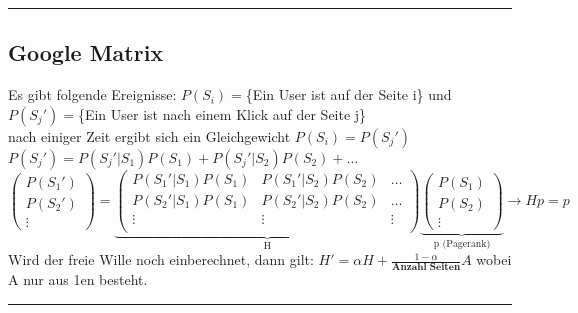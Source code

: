 \hrule

\subsection{Google Matrix}
	Es gibt folgende Ereignisse: $P(S_i)=$\{Ein User ist auf der Seite i\} und \\
								 \hspace*{43.3mm}$P(S_j')=$\{Ein User ist nach einem Klick auf der Seite j\} \\
	nach einiger Zeit ergibt sich ein Gleichgewicht $P(S_i)=P(S_j')$ \\
	$P(S_j')=P(S_j'|S_1)P(S_1)+P(S_j'|S_2)P(S_2)+\dots$ \\
	$\begin{pmatrix}P(S_1')\\P(S_2')\\\vdots\end{pmatrix} = 
	\underbrace{\begin{pmatrix}P(S_1'|S_1)P(S_1) & P(S_1'|S_2)P(S_2) & \ldots \\
	P(S_2'|S_1)P(S_1) & P(S_2'|S_2)P(S_2) & \ldots \\
	\vdots & \vdots & \vdots \\
	\end{pmatrix}}_{\text{H}}
	\underbrace{\begin{pmatrix}P(S_1)\\P(S_2)\\\vdots\end{pmatrix}}_{\text{p (Pagerank)}} \rightarrow Hp=p$ \\
	Wird der freie Wille noch einberechnet, dann gilt: $H'=\alpha H+\frac{1-\alpha}{\textbf{Anzahl Seiten}}A$ wobei A nur aus 1en besteht.\\
	
\hrule

